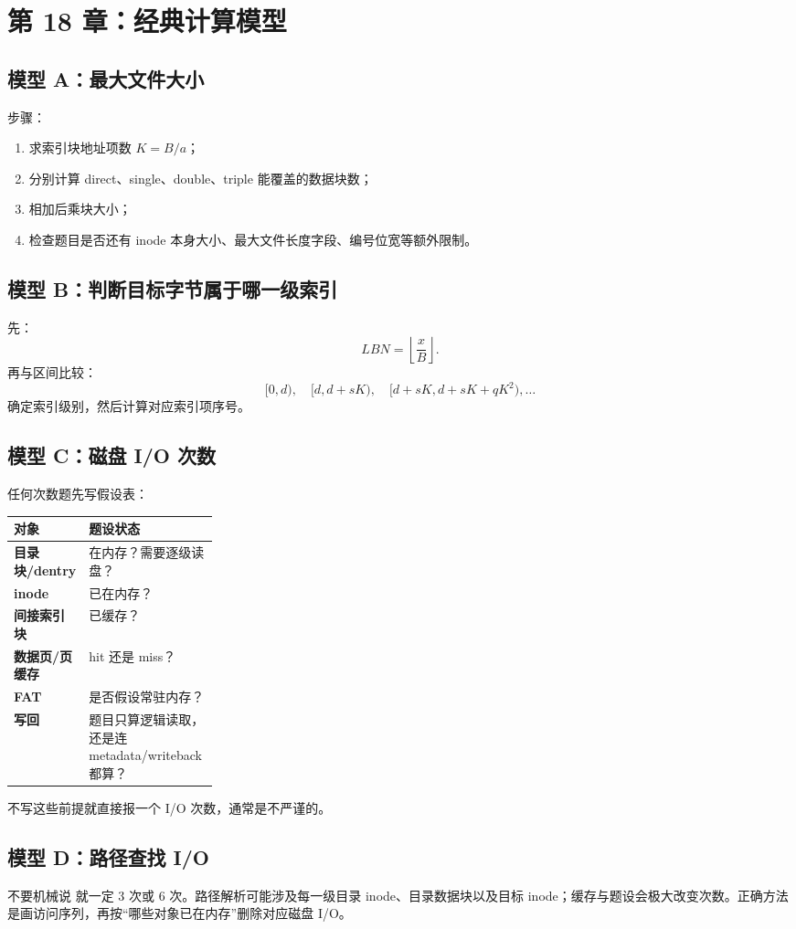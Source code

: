 \documentclass[11pt,a4paper]{ctexart}
\newcommand{\code}[1]{\texttt{\detokenize{#1}}}
\begin{document}
\section{第 18 章：经典计算模型}

\subsection{模型 A：最大文件大小}
步骤：
\begin{enumerate}
  \item 求索引块地址项数 $K=B/a$；
  \item 分别计算 direct、single、double、triple 能覆盖的数据块数；
  \item 相加后乘块大小；
  \item 检查题目是否还有 inode 本身大小、最大文件长度字段、编号位宽等额外限制。
\end{enumerate}

\subsection{模型 B：判断目标字节属于哪一级索引}
先：
\[
LBN=\left\lfloor\frac{x}{B}\right\rfloor.
\]
再与区间比较：
\[
[0,d),\quad[d,d+sK),\quad[d+sK,d+sK+qK^2),\ldots
\]
确定索引级别，然后计算对应索引项序号。

\subsection{模型 C：磁盘 I/O 次数}
任何次数题先写假设表：
\begin{center}
\small
\begin{tabularx}{\linewidth}{>{\bfseries}p{0.26\linewidth} X}
\toprule
对象 & 题设状态 \\
\midrule
目录块/dentry & 在内存？需要逐级读盘？ \\
inode & 已在内存？ \\
间接索引块 & 已缓存？ \\
数据页/页缓存 & hit 还是 miss？ \\
FAT & 是否假设常驻内存？ \\
写回 & 题目只算逻辑读取，还是连 metadata/writeback 都算？ \\
\bottomrule
\end{tabularx}
\end{center}
不写这些前提就直接报一个 I/O 次数，通常是不严谨的。

\subsection{模型 D：路径查找 I/O}
不要机械说 \code{/a/b/c} 就一定 3 次或 6 次。路径解析可能涉及每一级目录 inode、目录数据块以及目标 inode；缓存与题设会极大改变次数。正确方法是画访问序列，再按“哪些对象已在内存”删除对应磁盘 I/O。
\end{document}
